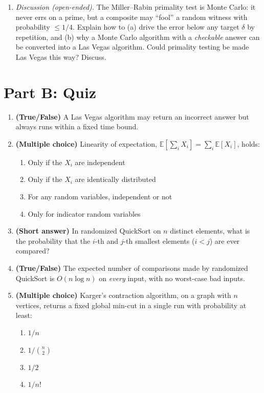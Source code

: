 \documentclass[11pt]{article}
\begin{document}
\begin{enumerate}[label=\textbf{A\arabic*.}, leftmargin=2.2em]
\item \emph{Discussion (open-ended).} The Miller--Rabin primality test is Monte Carlo: it
never errs on a prime, but a composite may ``fool'' a random witness with probability
$\le 1/4$. Explain how to (a) drive the error below any target $\delta$ by repetition, and
(b) why a Monte Carlo algorithm with a \emph{checkable} answer can be converted into a Las
Vegas algorithm. Could primality testing be made Las Vegas this way? Discuss.

\end{enumerate}

\newpage
\section*{Part B: Quiz}

\begin{enumerate}[label=\textbf{B\arabic*.}, leftmargin=2.2em]

\item \textbf{(True/False)} A Las Vegas algorithm may return an incorrect answer but always
runs within a fixed time bound.

\item \textbf{(Multiple choice)} Linearity of expectation, $\mathbb{E}[\sum_i X_i] =
\sum_i \mathbb{E}[X_i]$, holds:
\begin{enumerate}[label=(\alph*)]
    \item Only if the $X_i$ are independent
    \item Only if the $X_i$ are identically distributed
    \item For any random variables, independent or not
    \item Only for indicator random variables
\end{enumerate}

\item \textbf{(Short answer)} In randomized QuickSort on $n$ distinct elements, what is the
probability that the $i$-th and $j$-th smallest elements ($i<j$) are ever compared?

\item \textbf{(True/False)} The expected number of comparisons made by randomized QuickSort
is $O(n \log n)$ on \emph{every} input, with no worst-case bad inputs.

\item \textbf{(Multiple choice)} Karger's contraction algorithm, on a graph with $n$
vertices, returns a fixed global min-cut in a single run with probability at least:
\begin{enumerate}[label=(\alph*)]
    \item $1/n$
    \item $1/\binom{n}{2}$
    \item $1/2$
    \item $1/n!$
\end{enumerate}


\end{enumerate}
\end{document}
